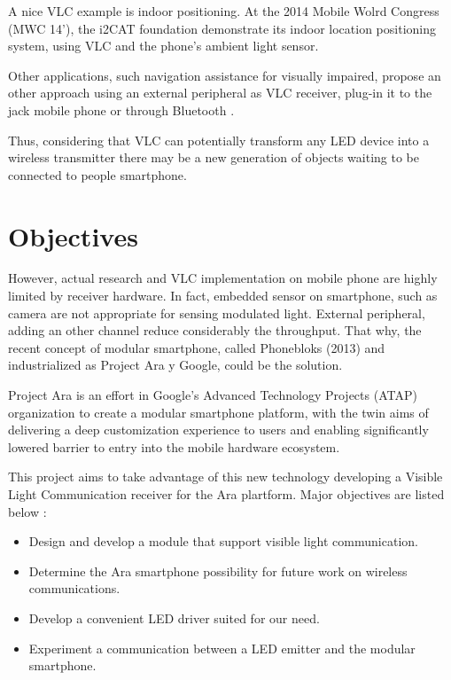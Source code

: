 A nice VLC example is indoor positioning. At the 2014 Mobile Wolrd Congress (MWC 14'), the i2CAT foundation demonstrate its indoor location positioning system, using VLC and the phone's ambient light sensor.

Other applications, such navigation assistance for visually impaired, propose an other approach using an external peripheral as VLC receiver, plug-in it to the jack mobile phone or through Bluetooth \citep{bluereceiver}.

Thus, considering that VLC can potentially transform any LED device into a wireless transmitter there may be a new generation of objects waiting to be connected to people smartphone.



\section{Objectives}
However, actual research and VLC implementation on mobile phone are highly limited by receiver hardware. In fact, embedded sensor on smartphone, such as camera are not appropriate for sensing modulated light. External peripheral, adding an other channel reduce considerably the throughput.
That why, the recent concept of modular smartphone, called Phonebloks (2013) and industrialized as Project Ara y Google, could be the solution.

Project Ara is an effort in Google's Advanced Technology Projects (ATAP) organization to create a modular smartphone platform, with the twin aims of delivering a deep customization experience to users and enabling significantly lowered barrier to entry into the mobile hardware ecosystem.

This project aims to take advantage of this new technology developing a Visible Light Communication receiver for the Ara plartform. Major objectives are listed below :
\begin{itemize}
\item Design and develop a module that support visible light communication.
\item Determine the Ara smartphone possibility for future work on wireless communications.
\item Develop a convenient LED driver suited for our need. 
\item Experiment a communication between a LED emitter and the modular smartphone.
\end{itemize}


